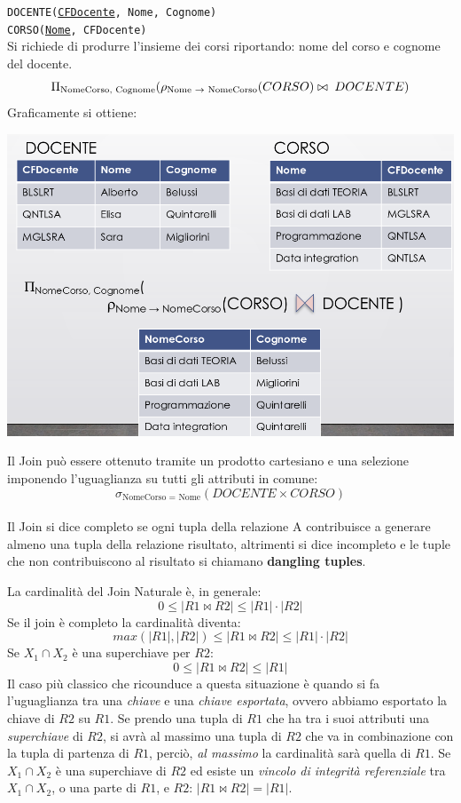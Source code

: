 \documentclass{report}
\begin{document}
\noindent\texttt{DOCENTE(\underline{CFDocente}, Nome, Cognome) \\
CORSO(\underline{Nome}, CFDocente)}\\

\noindent Si richiede di produrre l'insieme dei corsi riportando: nome del corso e cognome del docente.
\[ \Pi_{\text{NomeCorso, Cognome}}(\rho_{\text{Nome $\to$ NomeCorso}}(CORSO) \bowtie \thickspace DOCENTE)\]
Graficamente si ottiene:

\begin{center}
\includegraphics[scale=0.35]{join_example}

\end{center}


Il Join può essere ottenuto tramite un prodotto cartesiano e una selezione imponendo l’uguaglianza su tutti gli attributi in comune:\\
$$\sigma_{\text{NomeCorso = Nome}}(DOCENTE \times CORSO)$$\\
Il Join si dice completo se ogni tupla della relazione A contribuisce a generare almeno una tupla della relazione risultato, altrimenti si dice incompleto e le tuple che non contribuiscono al risultato si chiamano \textbf{dangling tuples}.

La cardinalità del Join Naturale è, in generale:
\[0 \leq |R1 \bowtie R2| \leq |R1| \cdot |R2|\]
Se il join \`e completo la cardinalit\`a diventa:
\[ max(|R1|, |R2|) \leq |R1 \bowtie R2| \leq |R1| \cdot |R2| \]
Se $X_1 \cap X_2$ \`e una superchiave per $R2$:
\[ 0 \le |R1 \bowtie R2| \leq |R1| \]
Il caso pi\`u classico che ricounduce a questa situazione \`e quando si fa l'uguaglianza tra una \emph{chiave} e una \emph{chiave esportata}, ovvero abbiamo esportato la chiave di $R2$ su $R1$. Se prendo una tupla di $R1$ che ha tra i suoi attributi una \emph{superchiave} di $R2$, si avr\`a al massimo una tupla di $R2$ che va in combinazione con la tupla di partenza di $R1$, perci\`o, \emph{al massimo} la cardinalit\`a sar\`a quella di $R1$. Se $X_1 \cap X_2$ \`e una superchiave di $R2$ ed esiste un \emph{vincolo di integrit\`a referenziale} tra $X_1 \cap X_2$, o una parte di $R1$, e $R2$: $|R1 \bowtie R2| = |R1|$.
\end{document}
